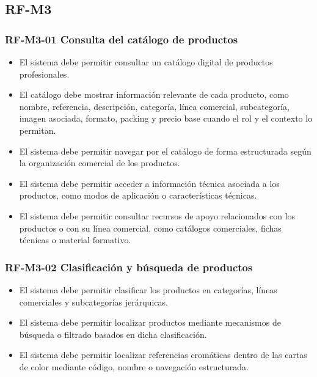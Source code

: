\subsection{RF-M3}

\vspace{-0.75em}
\subsubsection{RF-M3-01 Consulta del catálogo de productos}
\vspace{-1em}

\begin{itemize}
    \item El sistema debe permitir consultar un catálogo digital de productos profesionales.
    \item El catálogo debe mostrar información relevante de cada producto, como nombre, referencia, descripción, categoría, línea comercial, subcategoría, imagen asociada, formato, packing y precio base cuando el rol y el contexto lo permitan.
    \item El sistema debe permitir navegar por el catálogo de forma estructurada según la organización comercial de los productos.
    \item El sistema debe permitir acceder a información técnica asociada a los productos, como modos de aplicación o características técnicas.
    \item El sistema debe permitir consultar recursos de apoyo relacionados con los productos o con su línea comercial, como catálogos comerciales, fichas técnicas o material formativo.
\end{itemize}

\vspace{-0.75em}
\subsubsection{RF-M3-02 Clasificación y búsqueda de productos}
\vspace{-1em}

\begin{itemize}
    \item El sistema debe permitir clasificar los productos en categorías, líneas comerciales y subcategorías jerárquicas.
    \item El sistema debe permitir localizar productos mediante mecanismos de búsqueda o filtrado basados en dicha clasificación.
    \item El sistema debe permitir localizar referencias cromáticas dentro de las cartas de color mediante código, nombre o navegación estructurada.
\end{itemize}

